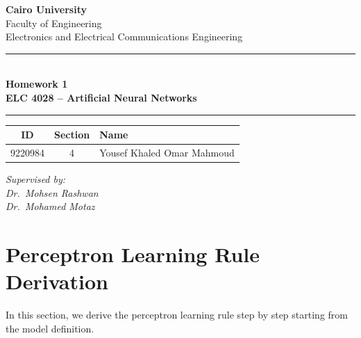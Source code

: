 \documentclass[12pt,a4paper]{article}
\begin{document}
\begin{titlepage}
\centering
\vspace*{0.5cm}


\vspace{0.5cm}
{\Large\bfseries Cairo University\\}
\vspace{0.2cm}
{\large Faculty of Engineering\\}
\vspace{0.2cm}
{\normalsize Electronics and Electrical Communications Engineering\\}

\vspace{1.2cm}
\rule{0.8\textwidth}{1.5pt}\\[0.4cm]
{\LARGE\bfseries Homework 1}\\[0.3cm]
{\large\bfseries ELC 4028 -- Artificial Neural Networks}\\[0.2cm]
\rule{0.8\textwidth}{1.5pt}

\vspace{1.2cm}

\begin{tabular}{|c|c|l|}
\hline
\textbf{ID} & \textbf{Section} & \textbf{Name} \\
\hline
9220984 & 4 & Yousef Khaled Omar Mahmoud \\
\hline
\end{tabular}

\vspace{1.2cm}

\textit{Supervised by:}\\[0.3cm]
\textit{Dr.\ Mohsen Rashwan}\\
\textit{Dr.\ Mohamed Motaz}

\vfill
\end{titlepage}

\setcounter{tocdepth}{3}
\tableofcontents
\newpage


\section{Perceptron Learning Rule Derivation}

In this section, we derive the perceptron learning rule step by step starting from the model definition.
\end{document}
